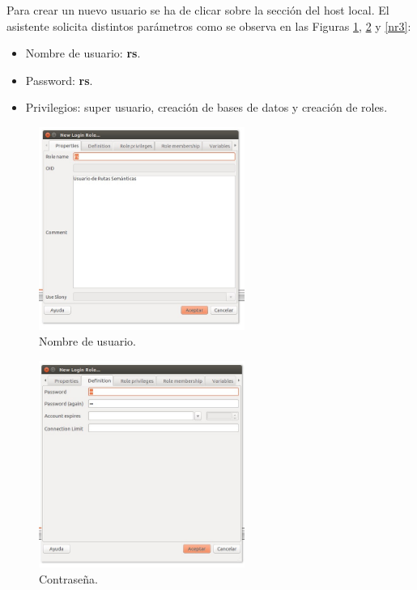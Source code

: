 Para crear un nuevo usuario se ha de clicar sobre la sección  del host local. El asistente solicita distintos parámetros como se observa en las Figuras \ref{nr1}, \ref{nr2} y \ref{nr3}:

\begin{itemize}
	\item Nombre de usuario: \textbf{rs}.
	\item Password: \textbf{rs}.
	\item Privilegios: super usuario, creación de bases de datos y creación de roles.
\end{itemize}

\begin{figure}[h]
  \centering
    \includegraphics[width=0.6\textwidth]{../img/instalacion/nr1.jpg}
  \caption{Nombre de usuario.}
  \label{nr1}
\end{figure}

\begin{figure}[h]
  \centering
    \includegraphics[width=0.6\textwidth]{../img/instalacion/nr2.jpg}
  \caption{Contraseña.}
  \label{nr2}
\end{figure}

